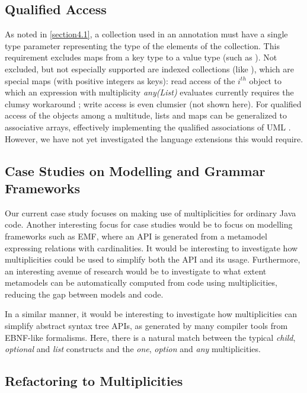 {\subsection{Qualified Access}
\label{section8.2}

\noindent As noted in \autoref{section4.1}, a collection  used in an
 annotation must have a single type parameter representing
the type of the elements of the collection. This requirement excludes maps
from a key type to a value type (such as ). Not
excluded, but not especially supported are indexed collections (like
), which are special maps (with positive integers as
keys): read access of the $i^{th}$ object to which an expression  with
multiplicity \emph{any(List)} evaluates currently requires
the clumsy workaround ; write access is even clumsier
(not shown here). For qualified access of the objects among a multitude,
lists and maps can be generalized to associative arrays, effectively
implementing the qualified associations of UML \cite{ref28}. However, we have not
yet investigated the language extensions this would require.

\subsection{Case Studies on Modelling and Grammar Frameworks}
\label{section8.3}

\noindent Our current case study focuses on making use of multiplicities for
ordinary Java code. Another interesting focus for case studies would be to
focus on modelling frameworks such as EMF, where an API is generated from a
metamodel expressing relations with cardinalities. It would be interesting
to investigate how multiplicities could be used to simplify both the API and
its usage. Furthermore, an interesting avenue of research would be to
investigate to what extent metamodels can be automatically computed from
code using multiplicities, reducing the gap between models and code.

In a similar manner, it would be interesting to investigate how
multiplicities can simplify abstract syntax tree APIs, as generated by many
compiler tools from EBNF-like formalisms. Here, there is a natural match
between the typical \emph{child}, \emph{optional} and
\emph{list} constructs and the \emph{one}, \emph{option} and
\emph{any} multiplicities.

\subsection{Refactoring to Multiplicities}
\label{section8.4}

}
